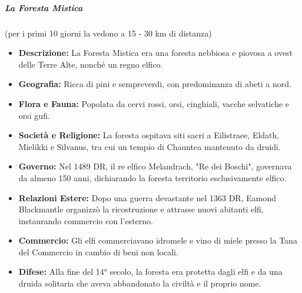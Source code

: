 \documentclass{article}
\begin{document}
                \subparagraph{La Foresta Mistica} (per i primi 10 giorni la vedono a 15 - 30 km di distanza)
                \begin{itemize}
                    \item \textbf{Descrizione:} La Foresta Mistica era una foresta nebbiosa e piovosa a ovest delle Terre Alte, nonché un regno elfico.
                    
                    \item \textbf{Geografia:} Ricca di pini e sempreverdi, con predominanza di abeti a nord.
                    
                    \item \textbf{Flora e Fauna:} Popolata da cervi rossi, orsi, cinghiali, vacche selvatiche e orsi gufi.
                    
                    \item \textbf{Società e Religione:} La foresta ospitava siti sacri a Eilistraee, Eldath, Mielikki e Silvanus, tra cui un tempio di Chauntea mantenuto da druidi.
                    
                    \item \textbf{Governo:} Nel 1489 DR, il re elfico Melandrach, "Re dei Boschi", governava da almeno 150 anni, dichiarando la foresta territorio esclusivamente elfico.
                    
                    \item \textbf{Relazioni Estere:} Dopo una guerra devastante nel 1363 DR, Eamond Blackmantle organizzò la ricostruzione e attrasse nuovi abitanti elfi, instaurando commercio con l'esterno.
                    
                    \item \textbf{Commercio:} Gli elfi commerciavano idromele e vino di miele presso la Tana del Commercio in cambio di beni non locali.
                    
                    \item \textbf{Difese:} Alla fine del 14° secolo, la foresta era protetta dagli elfi e da una druida solitaria che aveva abbandonato la civiltà e il proprio nome.
                \end{itemize}     
            
\end{document}
